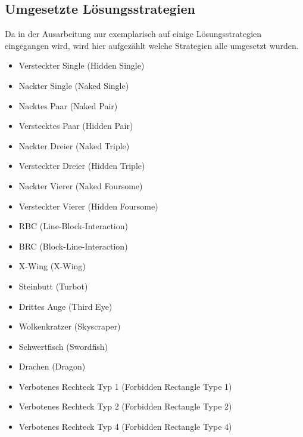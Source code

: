 \subsection{Umgesetzte Lösungsstrategien}
Da in der Ausarbeitung nur exemplarisch auf einige Lösungsstrategien eingegangen wird, wird hier aufgezählt welche Strategien alle umgesetzt wurden. 
\begin{itemize}
	\item Versteckter Single (Hidden Single)
	\item Nackter Single (Naked Single)
	\item Nacktes Paar (Naked Pair)
	\item Verstecktes Paar (Hidden Pair)
	\item Nackter Dreier (Naked Triple)
	\item Versteckter Dreier (Hidden Triple)
	\item Nackter Vierer (Naked Foursome)
	\item Versteckter Vierer (Hidden Foursome)
	\item \acf{RBC} (Line-Block-Interaction)
	\item \acf{BRC} (Block-Line-Interaction)
	\item X-Wing (X-Wing)
	\item Steinbutt (Turbot)
	\item Drittes Auge (Third Eye)
	\item Wolkenkratzer (Skyscraper)
	\item Schwertfisch (Swordfish)
	\item Drachen (Dragon)
	\item Verbotenes Rechteck Typ 1 (Forbidden Rectangle Type 1)
	\item Verbotenes Rechteck Typ 2 (Forbidden Rectangle Type 2)
	\item Verbotenes Rechteck Typ 4 (Forbidden Rectangle Type 4)
	
\end{itemize}

